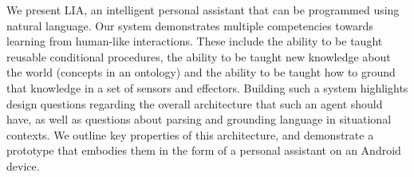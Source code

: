 We present LIA, an intelligent personal assistant that can be programmed using natural language. Our system demonstrates multiple competencies towards learning from human-like interactions. These include the ability to be taught reusable conditional procedures, the ability to be taught new knowledge about the world (concepts in an ontology) and the ability to be taught how to ground that knowledge in a set of sensors and effectors. Building such a system highlights design questions regarding the overall architecture that such an agent should have, as well as questions about parsing and grounding language in situational contexts. We outline key properties of this architecture, and demonstrate a prototype that embodies them in the form of a personal assistant on an Android device.
